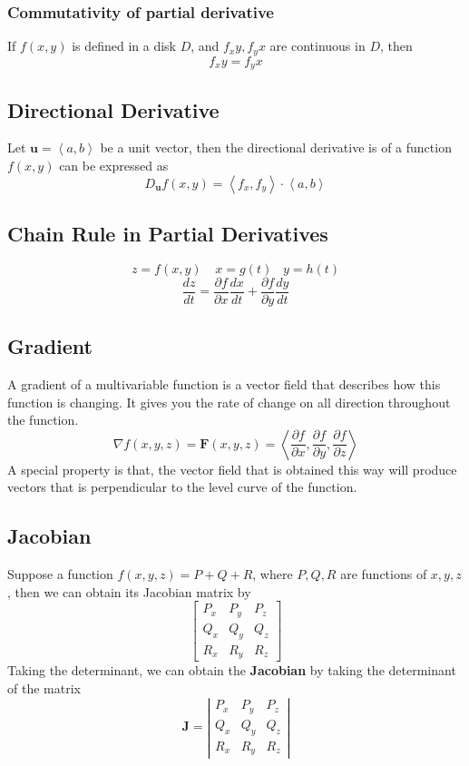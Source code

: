 \documentclass[12pt]{book}
\newcommand{\pypx}[2]{\frac{\partial #1}{\partial #2}}
\newcommand{\dydx}[2]{\frac{d #1}{d #2}}
\newcommand{\tribkt}[1]{\left< #1 \right>}
\newcommand{\abso}[1]{\left|#1 \right|}
\begin{document}
\subsubsection{Commutativity of partial derivative}
If $f(x,y)$ is defined in a disk $D$, and $f_xy,f_yx$ are continuous in $D$, then
\[
f_xy = f_yx
\]
\subsection{Directional Derivative}
Let $\textbf{u} = \tribkt{a,b}$ be a unit vector, then the directional derivative is of a function $f(x,y)$ can be expressed as 
\[
D_\textbf{u}f(x,y) = \tribkt{f_x,f_y}\cdot \tribkt{a,b}
\]

\subsection{Chain Rule in Partial Derivatives}
\[
z = f(x,y) \;\;\ \; x = g(t) \;\;\; y = h(t)
\]
\[
\dydx{z}{t} = \pypx{f}{x}\dydx{x}{t} + \pypx{f}{y}\dydx{y}{t}
\]
\subsection{Gradient}
A gradient of a multivariable function is a vector field that describes how this function is changing. It gives you the rate of change on all direction throughout the function. 
\[
\nabla f(x,y,z) = \textbf{F}(x,y,z)=\tribkt{ \pypx{f}{x}, \pypx{f}{y}, \pypx{f}{z}}
\]
A special property is that, the vector field that is obtained this way will produce vectors that is perpendicular to the level curve of the function. 

\subsection{Jacobian}
Suppose a function $f(x,y,z) = P+Q+R$, where $P,Q,R$ are functions of $x,y,z$, then we can obtain its Jacobian matrix by
\[
\begin{bmatrix}
    P_x & P_y & P_z\\
    Q_x & Q_y & Q_z\\
    R_x & R_y & R_z
\end{bmatrix}
\]
Taking the determinant, we can obtain the \textbf{Jacobian} by taking the determinant of the matrix
\[
\mathbf{J} = \abso{
\begin{matrix}
    P_x & P_y & P_z\\
    Q_x & Q_y & Q_z\\
    R_x & R_y & R_z
\end{matrix}
}
\]
\end{document}
